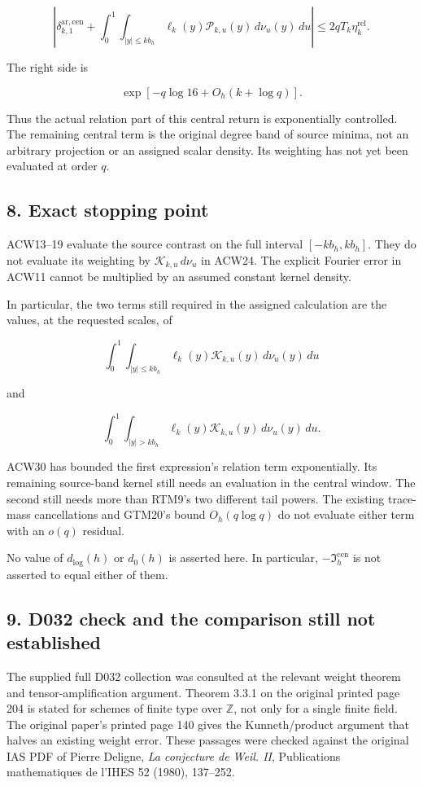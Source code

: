 \[
\boxed{
\left|\delta_{k,1}^{\mathrm{ar,cen}}
+\int_0^1\int_{|y|\le kb_h}
\ell_k(y)\mathcal P_{k,u}(y)\,d\nu_u(y)\,du\right|
\le2qT_k\eta_k^{\mathrm{rel}}.}
\tag{ACW30}
\]

The right side is

\[
\exp[-q\log16+O_h(k+\log q)].
\]

Thus the actual relation part of this central return is exponentially controlled. The remaining central term is the original degree band of source minima, not an arbitrary projection or an assigned scalar density. Its weighting has not yet been evaluated at order \(q\).

\subsection{8. Exact stopping point}\label{acw:exact-stopping-point}

ACW13--19 evaluate the source contrast on the full interval \([-kb_h,kb_h]\). They do not evaluate its weighting by \(\mathcal K_{k,u}\,d\nu_u\) in ACW24. The explicit Fourier error in ACW11 cannot be multiplied by an assumed constant kernel density.

In particular, the two terms still required in the assigned calculation are the values, at the requested scales, of

\[
\int_0^1\int_{|y|\le kb_h}
\ell_k(y)\mathcal K_{k,u}(y)\,d\nu_u(y)\,du
\]

and

\[
\int_0^1\int_{|y|>kb_h}
\ell_k(y)\mathcal K_{k,u}(y)\,d\nu_u(y)\,du.
\]

ACW30 has bounded the first expression's relation term exponentially. Its remaining source-band kernel still needs an evaluation in the central window. The second still needs more than RTM9's two different tail powers. The existing trace-mass cancellations and GTM20's bound \(O_h(q\log q)\) do not evaluate either term with an \(o(q)\) residual.

No value of \(d_{\log}(h)\) or \(d_0(h)\) is asserted here. In particular, \(-\mathfrak I_h^{\mathrm{cen}}\) is not asserted to equal either of them.

\subsection{9. D032 check and the comparison still not established}\label{acw:d032-check-and-the-comparison-still-not-established}

The supplied full D032 collection was consulted at the relevant weight theorem and tensor-amplification argument. Theorem 3.3.1 on the original printed page 204 is stated for schemes of finite type over \(\mathbb Z\), not only for a single finite field. The original paper's printed page 140 gives the Kunneth/product argument that halves an existing weight error. These passages were checked against the original IAS PDF of Pierre Deligne, \emph{La conjecture de Weil. II}, Publications mathematiques de l'IHES 52 (1980), 137--252.

